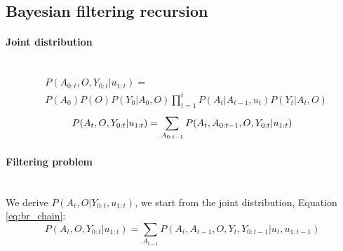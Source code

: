 
\subsection{Bayesian filtering recursion}\label{appendix:bayes_recursion}

\paragraph{Joint distribution}\\
\begin{align}
 &P(A_{0:t},O,Y_{0:t}|u_{1:t}) =\nonumber \\ 
 &P(A_0)P(O)P(Y_0|A_0,O)\prod_{t=1}^t P(A_t|A_{t-1},u_{t}) P(Y_t|A_t,O) \label{eq:ch5:app:joint}
\end{align}
\begin{equation}
  P(A_t,O,Y_{0:t}|u_{1:t}) = \sum_{A_{0:t-1}}  P(A_t,A_{0:t-1},O,Y_{0:t}|u_{1:t}) \\
\end{equation}


\paragraph{Filtering problem}\\
We derive $P(A_t,O|Y_{0:t},u_{1:t})$, we start from the joint distribution, Equation \ref{eq:br_chain}:
\begin{equation}
   P(A_t,O,Y_{0:t}|u_{1:t})  = \sum_{A_{t-1}} P(A_t,A_{t-1},O,Y_t,Y_{0:t-1}|u_{t},u_{1:t-1}) \label{eq:br_chain} 
\end{equation}


